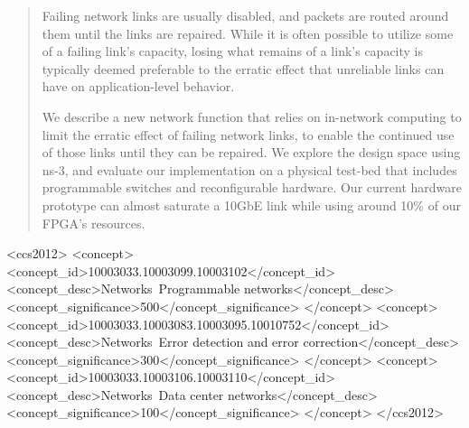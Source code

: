 \documentclass[sigconf]{acmart}
\newcommand{\FIXME}[1]{{\color{red}{\textbf{FIXME:} #1}}}
\newcommand{\hg}[1]{{\color{green}{[\textbf{Hans Comment:} #1]}}}
\begin{document}
\begin{abstract}
Failing network links are usually disabled, and packets are routed around them
until the links are repaired. While
it is often possible
to utilize some of a failing link's capacity, losing
what remains of a link's
capacity is typically deemed preferable to the erratic effect that unreliable links can
have on application-level behavior.

We describe a new network function that relies on in-network computing to limit
the erratic effect of failing network links, to enable the continued use of
those links until they can be repaired.
%
We explore the design space using ns-3, and evaluate our
implementation on a physical test-bed that includes programmable
switches and reconfigurable hardware.
Our current hardware prototype can almost saturate a 10GbE link while using
around 10\% of our FPGA's resources.
\end{abstract}

%
%
\begin{CCSXML}
<ccs2012>
<concept>
<concept_id>10003033.10003099.10003102</concept_id>
<concept_desc>Networks~Programmable networks</concept_desc>
<concept_significance>500</concept_significance>
</concept>
<concept>
<concept_id>10003033.10003083.10003095.10010752</concept_id>
<concept_desc>Networks~Error detection and error correction</concept_desc>
<concept_significance>300</concept_significance>
</concept>
<concept>
<concept_id>10003033.10003106.10003110</concept_id>
<concept_desc>Networks~Data center networks</concept_desc>
<concept_significance>100</concept_significance>
</concept>
</ccs2012>
\end{CCSXML}

\end{document}
